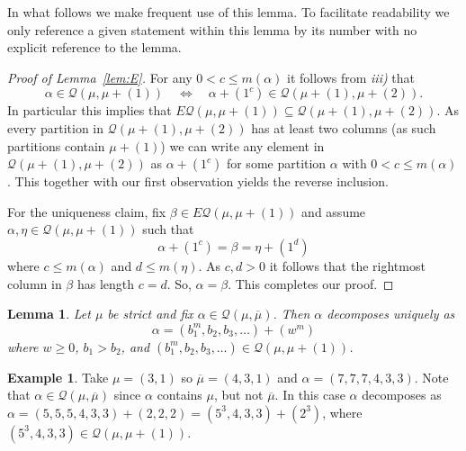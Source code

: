 \documentclass{article}
\theoremstyle{plain}
\newtheorem{lemma}[theorem]{Lemma}
\theoremstyle{definition}
\newtheorem{example}[theorem]{Example}
\newcommand{\Q}{\mathcal{Q}}
\renewcommand{\ne}[1]{\overline{#1}}
\begin{document}
In what follows we make frequent use of this lemma.  To facilitate readability we only reference a given statement within this lemma by its number with no explicit reference to the lemma.  

\begin{proof}[Proof of Lemma~\ref{lem:E}]
For any $0<c\leq m(\alpha)$ it follows from \emph{iii)} that
$$\alpha\in \Q(\mu,\mu +(1))\quad \Longleftrightarrow\quad  \alpha +(1^c)\in \Q(\mu+(1),\mu+(2)).$$
In particular this implies that $E\Q(\mu,\mu+(1)) \subseteq \Q(\mu+(1),\mu+(2))$.  As every partition in $\Q(\mu+(1),\mu+(2))$ has at least two columns (as such partitions contain $\mu+(1)$) we can write any element in $\Q(\mu+(1),\mu+(2))$ as $\alpha+(1^c)$ for some partition $\alpha$ with $0<c\leq m(\alpha)$.  This together with our first observation yields the reverse inclusion.  

For the uniqueness claim, fix $\beta\in E\Q(\mu,\mu+(1))$ and assume $\alpha, \eta \in \Q(\mu,\mu+(1))$ such that 
$$\alpha +(1^c) = \beta = \eta +(1^d)$$
where $c\leq m(\alpha)$ and $d\leq m(\eta )$.   As $c,d>0$ it follows that the  rightmost column in $\beta$ has length $c=d$.  So, $\alpha = \beta$.  This completes our proof.
\end{proof}



\begin{lemma}\label{lem:Q(mu,nemu)}
	Let $\mu$ be strict and fix $\alpha \in \Q(\mu,\ne\mu)$.  Then  $\alpha$ decomposes uniquely as 
$$\alpha = (b_1^m,b_2,b_3,\ldots) +(w^m)$$
where $w\geq 0$, $b_1>b_2$, and $(b_1^m,b_2,b_3,\ldots) \in \Q(\mu, \mu+(1))$.  
\end{lemma}

\begin{example}
Take $\mu = (3,1)$ so $\ne\mu = (4,3,1)$ and $\alpha = (7,7,7,4,3,3)$.  Note that $\alpha \in \Q(\mu,\ne\mu)$ since $\alpha$ contains $\mu$, but not $\ne\mu$.  In this case $\alpha$ decomposes as $\alpha = (5,5,5,4,3,3)+(2,2,2)= (5^3,4,3,3)+(2^3)$, where $(5^3,4,3,3) \in \Q(\mu,\mu + (1))$.
\end{example}
\end{document}

